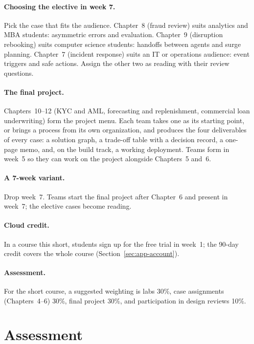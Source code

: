 \paragraph{Choosing the elective in week 7.} Pick the case that fits the audience. Chapter~8 (fraud review) suits analytics and MBA students: asymmetric errors and evaluation. Chapter~9 (disruption rebooking) suits computer science students: handoffs between agents and surge planning. Chapter~7 (incident response) suits an IT or operations audience: event triggers and safe actions. Assign the other two as reading with their review questions.

\paragraph{The final project.} Chapters~10--12 (KYC and AML, forecasting and replenishment, commercial loan underwriting) form the project menu. Each team takes one as its starting point, or brings a process from its own organization, and produces the four deliverables of every case: a solution graph, a trade-off table with a decision record, a one-page memo, and, on the build track, a working deployment. Teams form in week~5 so they can work on the project alongside Chapters~5 and~6.

\paragraph{A 7-week variant.} Drop week~7. Teams start the final project after Chapter~6 and present in week~7; the elective cases become reading.

\paragraph{Cloud credit.} In a course this short, students sign up for the free trial in week~1; the 90-day credit covers the whole course (Section~\ref{sec:app-account}).

\paragraph{Assessment.} For the short course, a suggested weighting is labs 30\%, case assignments (Chapters~4--6) 30\%, final project 30\%, and participation in design reviews 10\%.

\section{Assessment}

